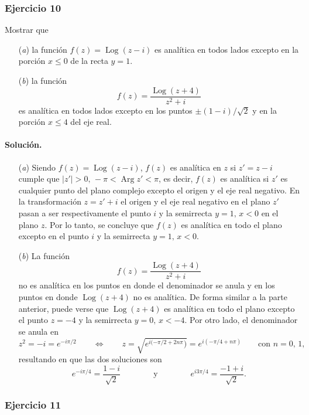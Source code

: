 \documentclass[a4paper]{report}
\DeclareMathOperator{\Arg}{Arg}
\DeclareMathOperator{\Log}{Log}
\begin{document}
\subsubsection{Ejercicio 10}

Mostrar que 
\begin{enumerate}
 \item[(\textit{a})] la función \(f(z)=\Log(z-i)\) es analítica en todos lados excepto en la porción \(x\leq0\) de la recta \(y=1\).
 \item[(\textit{b})] la función
 \[
  f(z)=\frac{\Log(z+4)}{z^2+i}
 \]
 es analítica en todos lados excepto en los puntos \(\pm(1-i)/\sqrt{2}\) y en la porción \(x\leq4\) del eje real.
\end{enumerate}

\paragraph{Solución.}

\begin{enumerate}
 \item[(\textit{a})] Siendo \(f(z)=\Log(z-i)\), \(f(z)\) es analítica en \(z\) si \(z'=z-i\) cumple que \(|z'|>0,\,-\pi<\Arg z'<\pi\), es decir, \(f(z)\) es analítica si \(z'\) es cualquier punto del plano complejo excepto el origen y el eje real negativo. En la transformación \(z=z'+i\) el origen y el eje real negativo en el plano \(z'\) pasan a ser respectivamente el punto \(i\) y la semirrecta \(y=1,\,x<0\) en el plano \(z\). Por lo tanto, se concluye que \(f(z)\) es analítica en todo el plano excepto en el punto \(i\) y la semirrecta \(y=1,\,x<0\).
 \item[(\textit{b})] La función
 \[
  f(z)=\frac{\Log(z+4)}{z^2+i}
 \]
 no es analítica en los puntos en donde el denominador se anula y en los puntos en donde \(\Log(z+4)\) no es analítica. De forma similar a la parte anterior, puede verse que \(\Log(z+4)\) es analítica en todo el plano excepto el punto \(z=-4\) y la semirrecta \(y=0,\,x<-4\). Por otro lado, el denominador se anula en 
 \[
  z^2=-i=e^{-i\pi/2}
  \qquad\Leftrightarrow\qquad
  z=\sqrt{e^{i(-\pi/2+2n\pi})}=e^{i(-\pi/4+n\pi)}
  \qquad\textrm{con }n=0,\,1,
 \]
 resultando en que las dos soluciones son
 \[
  e^{-i\pi/4}=\frac{1-i}{\sqrt{2}}
  \qquad\qquad\textrm{y}\qquad\qquad
  e^{i3\pi/4}=\frac{-1+i}{\sqrt{2}}.
 \]
\end{enumerate}

\subsubsection{Ejercicio 11}
\end{document}
